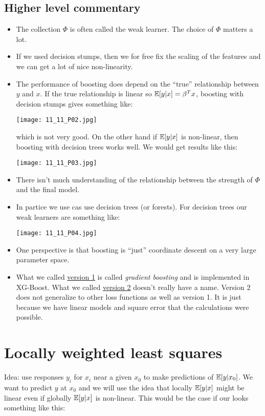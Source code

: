 \subsection{Higher level commentary}
\begin{itemize}
    \item The collection $\Phi$ is often called the weak learner. The choice of $\Phi$ matters a lot.
    \item If we used decision stumps, then we for free fix the scaling of the features and we can get a lot of nice non-linearity.
    \item The performance of boosting does depend on the ``true'' relationship between $y$ and $x$. If the true relationship is linear so ${\mathbb{E}}[y|x]=\beta^T x$, boosting with decision stumps gives something like:\begin{center}
        
    \texttt{[image: 11\_11\_P02.jpg]}
    \end{center}
    which is not very good. On the other hand if ${\mathbb{E}}[y|x]$ is non-linear, then boosting with decision trees works well. We would get results like this:\begin{center}
        
    \texttt{[image: 11\_11\_P03.jpg]}
    \end{center}
    \item There isn't much understanding of the relationship between the strength of $\Phi$ and the final model.
    \item In partice we use cas use decision trees (or forests). For decision trees our weak learners are something like:
    \begin{center}
    
        \texttt{[image: 11\_11\_P04.jpg]}    
    \end{center} 
    \item One perspective is that boosting is ``just'' coordinate descent on a very large parameter space.
    \item What we called \underline{version 1} is called \emph{gradient boosting} and is implemented in XG-Boost. What we called  \underline{version 2} doesn't really have a name. Version 2 does not generalize to other loss functions as well as version 1. It is just because we have linear models and square error that the calculations were possible.
\end{itemize}
\section{Locally weighted least squares}
Idea: use responses $y_i$ for $x_i$ near a given $x_0$ to make predictions of ${\mathbb{E}}[y|x_0]$. We want to predict $y$ at $x_0$ and we will use the idea that locally ${\mathbb{E}}[y|x]$ might be linear even if globally ${\mathbb{E}}[y|x]$ is non-linear. This would be the case if our looks something like this: 

